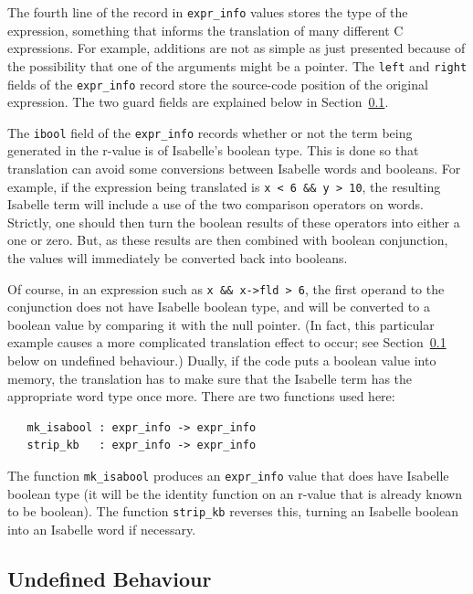 \documentclass{article}
\begin{document}
The fourth line of the record in \texttt{expr_info} values stores the
type of the expression, something that informs the translation of many
different C expressions.  For example, additions are not as simple as
just presented because of the possibility that one of the arguments
might be a pointer.  The \texttt{left} and \texttt{right} fields of
the \texttt{expr_info} record store the source-code position of the
original expression.  The two guard fields are explained below in
Section~\ref{sec:undefined-behaviour}.

The \texttt{ibool} field of the \texttt{expr_info} records whether or
not the term being generated in the r-value is of Isabelle's boolean
type.  This is done so that translation can avoid some conversions
between Isabelle words and booleans.  For example, if the expression
being translated is \verb|x < 6 && y > 10|, the resulting Isabelle
term will include a use of the two comparison operators on words.
Strictly, one should then turn the boolean results of these operators
into either a one or zero.  But, as these results are then combined
with boolean conjunction, the values will immediately be converted
back into booleans.

Of course, in an expression such as \verb|x && x->fld > 6|, the first
operand to the conjunction does not have Isabelle boolean type, and
will be converted to a boolean value by comparing it with the null
pointer.  (In fact, this particular example causes a more complicated
translation effect to occur; see Section~\ref{sec:undefined-behaviour}
below on undefined behaviour.)  Dually, if the code puts a boolean
value into memory, the translation has to make sure that the Isabelle
term has the appropriate word type once more.  There are two functions
used here:
\begin{verbatim}
   mk_isabool : expr_info -> expr_info
   strip_kb   : expr_info -> expr_info
\end{verbatim}
The function \texttt{mk_isabool} produces an \texttt{expr_info} value
that does have Isabelle boolean type (it will be the identity function
on an r-value that is already known to be boolean).  The function
\texttt{strip_kb} reverses this, turning an Isabelle boolean into an
Isabelle word if necessary.

\subsection{Undefined Behaviour}
\label{sec:undefined-behaviour}
\end{document}
